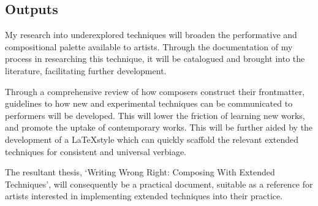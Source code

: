 \subsection{Outputs}
My research into underexplored techniques will broaden the performative and compositional palette available to artists. 
Through the documentation of my process in researching this technique, it will be catalogued and brought into the literature, facilitating further development.


Through a comprehensive review of how composers construct their frontmatter, guidelines to how new and experimental techniques can be communicated to performers will be developed.
This will lower the friction of learning new works, and promote the uptake of contemporary works.
This will be further aided by the development of a \LaTeX style which can quickly scaffold the relevant extended techniques for consistent and universal verbiage.

The resultant thesis, `Writing Wrong Right: Composing With Extended Techniques', will consequently be a practical document, suitable as a reference for artists interested in implementing extended techniques into their practice.